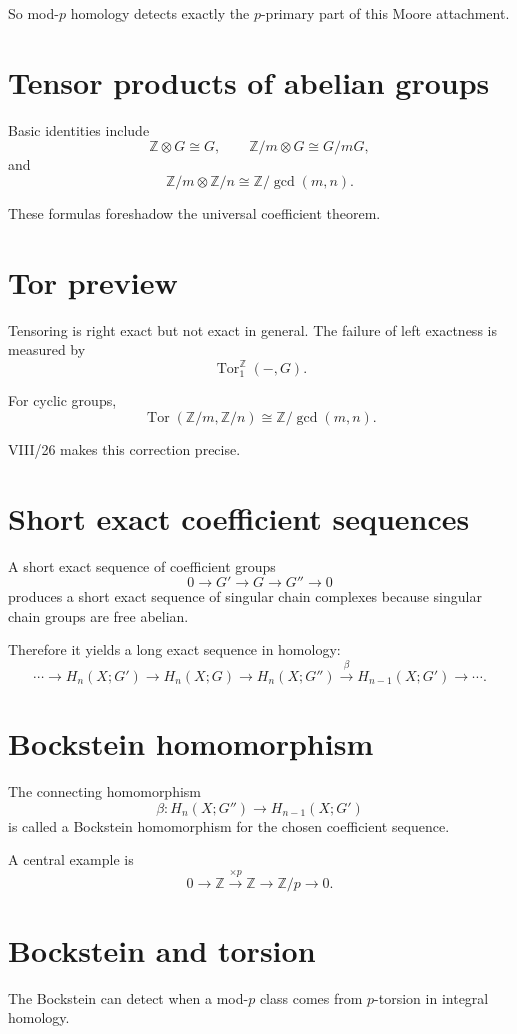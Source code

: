 So mod-\(p\) homology detects exactly the \(p\)-primary part of this Moore
attachment.

\section{Tensor products of abelian groups}
Basic identities include
\[
\mathbb Z\otimes G\cong G,
\qquad
\mathbb Z/m\otimes G\cong G/mG,
\]
and
\[
\mathbb Z/m\otimes\mathbb Z/n
\cong
\mathbb Z/\gcd(m,n).
\]

These formulas foreshadow the universal coefficient theorem.

\section{Tor preview}
Tensoring is right exact but not exact in general.  The failure of left
exactness is measured by
\[
\operatorname{Tor}_1^{\mathbb Z}(-,G).
\]

For cyclic groups,
\[
\operatorname{Tor}(\mathbb Z/m,\mathbb Z/n)
\cong
\mathbb Z/\gcd(m,n).
\]

VIII/26 makes this correction precise.

\section{Short exact coefficient sequences}
A short exact sequence of coefficient groups
\[
0\to G'\to G\to G''\to0
\]
produces a short exact sequence of singular chain complexes because singular
chain groups are free abelian.

Therefore it yields a long exact sequence in homology:
\[
\cdots\to H_n(X;G')
\to H_n(X;G)
\to H_n(X;G'')
\xrightarrow{\beta}
H_{n-1}(X;G')\to\cdots.
\]

\section{Bockstein homomorphism}
The connecting homomorphism
\[
\beta:H_n(X;G'')\to H_{n-1}(X;G')
\]
is called a Bockstein homomorphism for the chosen coefficient sequence.

A central example is
\[
0\to\mathbb Z\xrightarrow{\times p}\mathbb Z\to\mathbb Z/p\to0.
\]

\section{Bockstein and torsion}
The Bockstein can detect when a mod-\(p\) class comes from \(p\)-torsion in
integral homology.

